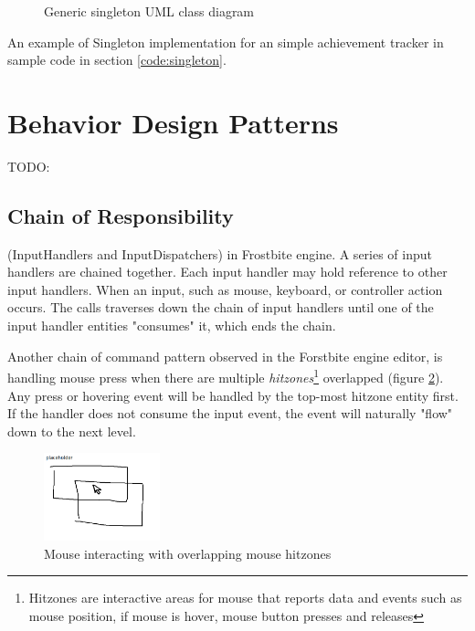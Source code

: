 \documentclass[10pt,letterpaper]{article}
\newcommand{\bs}{\bigskip}
\begin{document}
\begin{multicols}{2}
\begin{figure}[H]
	\centering


	\caption{Generic singleton UML class diagram}
	\label{fig:singleton}
\end{figure}

An example of Singleton implementation for an simple achievement tracker in sample code in section \ref{code:singleton}.

\section{Behavior Design Patterns}

TODO:

\subsection{Chain of Responsibility}

(InputHandlers and InputDispatchers) in Frostbite engine. A series of input handlers are chained together. Each input handler may hold reference to other input handlers.
\bs
When an input, such as mouse, keyboard, or controller action occurs. The calls traverses down the chain of input handlers until one of the input handler entities "consumes" it, which ends the chain.
\bs

Another chain of command pattern observed in the Forstbite engine editor, is handling mouse press when there are multiple \textit{hitzones}\footnote{Hitzones are interactive areas for mouse that reports data and events such as mouse position, if mouse is hover, mouse button presses and releases} overlapped (figure \ref{fig:chainofcommand-mousezones}). Any press or hovering event will be handled by the top-most hitzone entity first. If the handler does not consume the input event, the event will naturally "flow" down to the next level.
\bs

\begin{figure}[H]
	\centering
	\includegraphics[width=0.3\textwidth]{assets/chainofcommand_mousezones}
	\caption{Mouse interacting with overlapping mouse hitzones}
	\label{fig:chainofcommand-mousezones}
\end{figure}


\end{multicols}
\end{document}

